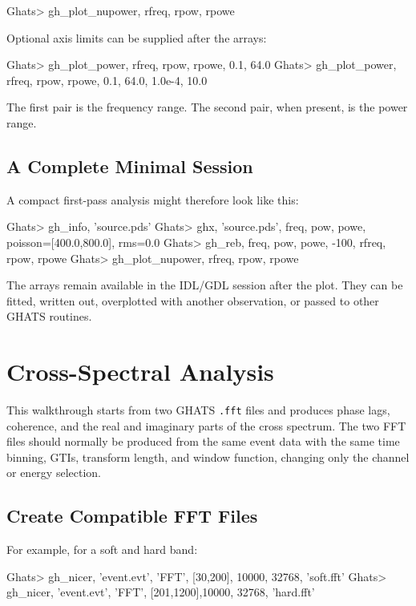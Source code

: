 \begin{ghatsconsole}
Ghats> gh_plot_nupower, rfreq, rpow, rpowe
\end{ghatsconsole}

Optional axis limits can be supplied after the arrays:

\begin{ghatsconsole}
Ghats> gh_plot_power, rfreq, rpow, rpowe, 0.1, 64.0
Ghats> gh_plot_power, rfreq, rpow, rpowe, 0.1, 64.0, 1.0e-4, 10.0
\end{ghatsconsole}

The first pair is the frequency range.  The second pair, when present, is the
power range.

\subsection*{A Complete Minimal Session}

A compact first-pass analysis might therefore look like this:

\begin{ghatsconsole}
Ghats> gh_info, 'source.pds'
Ghats> ghx, 'source.pds', freq, pow, powe, poisson=[400.0,800.0], rms=0.0
Ghats> gh_reb, freq, pow, powe, -100, rfreq, rpow, rpowe
Ghats> gh_plot_nupower, rfreq, rpow, rpowe
\end{ghatsconsole}

The arrays remain available in the IDL/GDL session after the plot.  They can
be fitted, written out, overplotted with another observation, or passed to
other GHATS routines.

\section{Cross-Spectral Analysis}

This walkthrough starts from two GHATS \texttt{.fft} files and produces phase
lags, coherence, and the real and imaginary parts of the cross spectrum.  The
two FFT files should normally be produced from the same event data with the
same time binning, GTIs, transform length, and window function, changing only
the channel or energy selection.

\subsection*{Create Compatible FFT Files}

For example, for a soft and hard band:

\begin{ghatsconsole}
Ghats> gh_nicer, 'event.evt', 'FFT', [30,200],  10000, 32768, 'soft.fft'
Ghats> gh_nicer, 'event.evt', 'FFT', [201,1200],10000, 32768, 'hard.fft'
\end{ghatsconsole}

